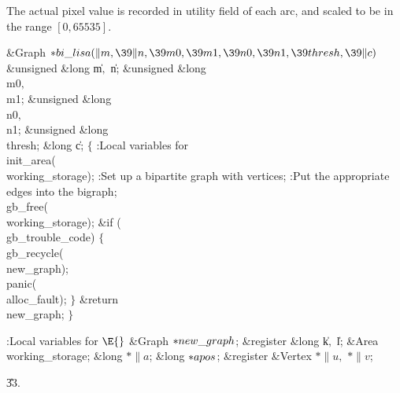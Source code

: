 The actual pixel value is recorded in utility field  of each arc,
and scaled to be in the range $[0,65535]$.

\Y\B\1\1\&{Graph} ${}{*}\\{bi\_lisa}(\|m,\39\|n,\39\\{m0},\39\\{m1},\39\\{n0},%
\39\\{n1},\39\\{thresh},\39\|c){}$\6
\&{unsigned} \&{long} \|m${},{}$ \|n;\6
\&{unsigned} \&{long} \\{m0}${},{}$ \\{m1};\C{ input will be from rows $[\PB{%
\\{m0}}\,.\,.\,\PB{\\{m1}})$ }\6
\&{unsigned} \&{long} \\{n0}${},{}$ \\{n1};\C{ and from columns $[\PB{\\{n0}}%
\,.\,.\,\PB{\\{n1}})$ }\6
\&{unsigned} \&{long} \\{thresh};\6
\&{long} \|c;\2\2\6
${}\{{}$\5
\1:Local variables for \X\7
\\{init\_area}(\\{working\_storage});\6
:Set up a bipartite graph with  vertices\X;\6
:Put the appropriate edges into the bigraph\X;\6
\\{gb\_free}(\\{working\_storage});\6
\&{if} (\\{gb\_trouble\_code})\5
${}\{{}$\1\6
\\{gb\_recycle}(\\{new\_graph});\6
\\{panic}(\\{alloc\_fault});\6
\4${}\}{}$\2\6
\&{return} \\{new\_graph};\6
\4${}\}{}$\2\par
\fi

\B{}:Local variables for \X${}\E{}$\6
\&{Graph} ${}{*}\\{new\_graph}{}$;\6
\&{register} \&{long} \|k${},{}$ \|l;\6
\&{Area} \\{working\_storage};\6
\&{long} ${}{*}\|a{}$;\6
\&{long} ${}{*}\\{apos}{}$;\6
\&{register} \&{Vertex} ${}{*}\|u,{}$ ${}{*}\|v{}$;\par
\U33.\fi

